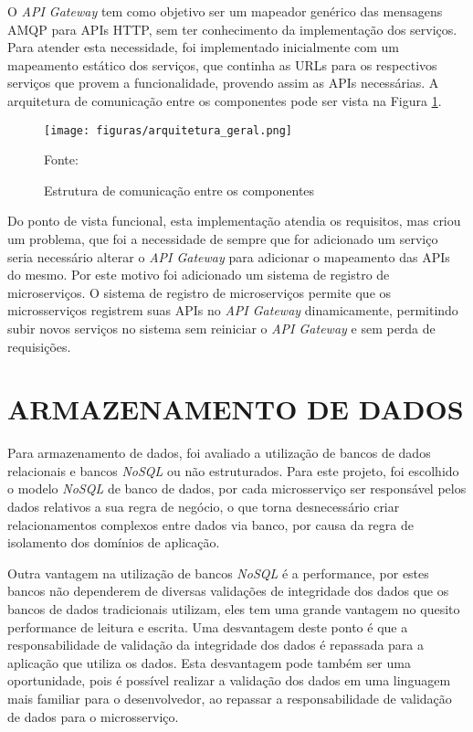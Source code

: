 O \emph{API Gateway} tem como objetivo ser um mapeador genérico das mensagens
\ac{AMQP} para \acp{API} \ac{HTTP}, sem ter conhecimento da implementação dos
serviços. Para atender esta necessidade, foi implementado inicialmente com um
mapeamento estático dos serviços, que continha as \acp{URL} para os respectivos
serviços que provem a funcionalidade, provendo assim as \acp{API} necessárias.
A arquitetura de comunicação entre os componentes pode ser vista na Figura
\ref{fig:arch-geral}.

\begin{figure}[H]
	\centering
	\caption{Estrutura de comunicação entre os componentes}
	\texttt{[image: figuras/arquitetura\_geral.png]}

    \label{fig:arch-geral}
	\footnotesize Fonte: \fonteOAutor
\end{figure}

Do ponto de vista funcional, esta implementação atendia os requisitos, mas
criou um problema, que foi a necessidade de sempre que for adicionado um
serviço seria necessário alterar o \emph{API Gateway} para adicionar o mapeamento
das \acp{API} do mesmo. Por este motivo foi adicionado um sistema de registro
de microserviços. O sistema de registro de microserviços permite que os
microsserviços registrem suas \acp{API} no \emph{API Gateway} dinamicamente,
permitindo subir novos serviços no sistema sem reiniciar o \emph{API Gateway}
e sem perda de requisições.

\section{ARMAZENAMENTO DE DADOS}

Para armazenamento de dados, foi avaliado a utilização de bancos de dados
relacionais e bancos \emph{NoSQL} ou não estruturados. Para este projeto, foi
escolhido o modelo \emph{NoSQL} de banco de dados, por cada microsserviço
ser responsável pelos dados relativos a sua regra de negócio, o que torna
desnecessário criar relacionamentos complexos entre dados via banco,
por causa da regra de isolamento dos domínios de aplicação.

Outra vantagem na utilização de bancos \emph{NoSQL} é a performance, por
estes bancos não dependerem de diversas validações de integridade dos dados
que os bancos de dados tradicionais utilizam, eles tem uma grande vantagem
no quesito performance de leitura e escrita. Uma desvantagem deste ponto é
que a responsabilidade de validação da integridade dos dados é repassada para
a aplicação que utiliza os dados. Esta desvantagem pode também ser uma
oportunidade, pois é possível realizar a validação dos dados em uma
linguagem mais familiar para o desenvolvedor, ao repassar a responsabilidade
de validação de dados para o microsserviço.

